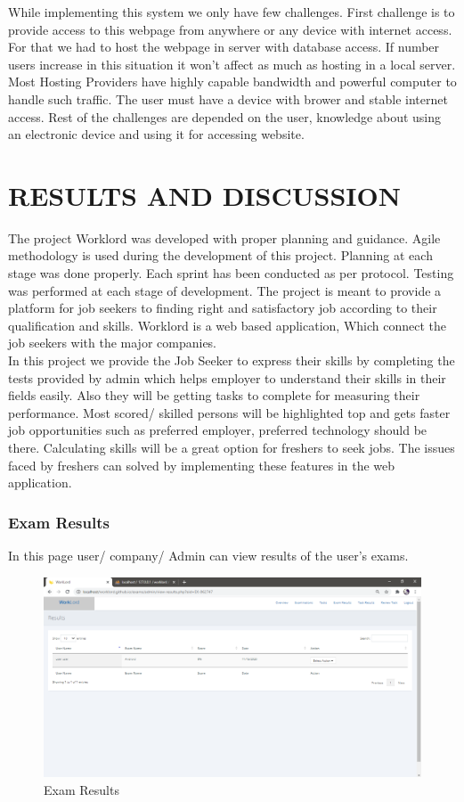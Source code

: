 \documentclass[a4paper,12pt]{report}
\begin{document}
While implementing this system we only have few challenges. First challenge is to provide access to this webpage from anywhere or any device with internet access. For that we had to host the webpage in server with database access. If number users increase in this situation it won't affect as much as hosting in a local server. Most Hosting Providers have highly capable bandwidth and powerful computer to handle such traffic. The user must have a device with brower and stable internet access. Rest of the challenges are depended on the user, knowledge about using an electronic device and using it for accessing website. \\

\pagebreak

\chapter{RESULTS AND DISCUSSION}

The project Worklord was developed with proper planning and guidance. Agile methodology is used during the development of this project. Planning at each stage was done properly. Each sprint has been conducted as per protocol. Testing was performed at each stage of development. The project is meant to provide a platform for job seekers to  finding right and satisfactory job according to their qualification and skills. Worklord is a web based application, Which connect the job seekers with the major companies.\\
 In this project we provide the Job Seeker to express
their skills by completing the tests provided by admin which helps employer to understand
their skills in their fields easily. Also they will be getting tasks to complete for measuring
their performance. Most scored/ skilled persons will be highlighted top and gets faster job
opportunities such as preferred employer, preferred technology should be there. Calculating skills will be a great option for freshers to seek jobs. The issues faced by freshers can
solved by implementing these features in the web application.
\pagebreak
\subsection {Exam Results}
In this page user/ company/ Admin can view results of the user's exams.
\begin{figure}[bph]
	\centering
	\includegraphics[width=.7\linewidth ]{img/screenshots/exams_results_pre}
	\caption{Exam Results}
\end{figure}
\end{document}
